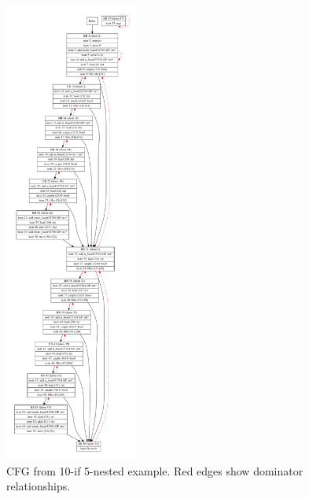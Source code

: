 \documentclass[10pt,twocolumn]{article}
\begin{document}
\begin{figure}
\begin{center}
  \includegraphics[height=6in]{figs/nested-if-10-5.pdf}
  \caption{CFG from 10-if 5-nested example. Red edges show dominator relationships.}
  \label{fig:nest-10-5} 
\end{center}
\end{figure}
\end{document}
